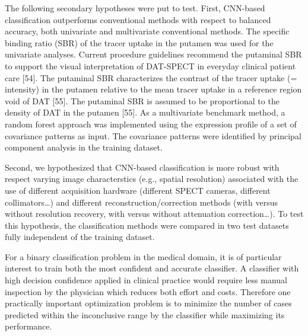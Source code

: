 The following secondary hypotheses were put to test. First, CNN-based classification outperforms conventional methods with respect to balanced accuracy, 
both univariate and multivariate conventional methods. 
The specific binding ratio (SBR) of the tracer uptake in the putamen was used for the univariate analyses. 
Current procedure guidelines recommend the putaminal SBR to support the visual interpretation of DAT-SPECT in everyday clinical patient care [54]. 
The putaminal SBR characterizes the contrast of the tracer uptake (= intensity) in the putamen relative to the mean tracer uptake in a reference 
region void of DAT [55]. 
The putaminal SBR is assumed to be proportional to the density of DAT in the putamen [55]. 
As a multivariate benchmark method, a random forest approach was implemented using the expression profile of a set of covariance patterns as input. 
The covariance patterns were identified by principal component analysis in the training dataset. 

Second, we hypothesized that CNN-based classification is more robust with respect varying image characterstics (e.g., spatial resolution) 
associated with the use of different acquisition hardware (different SPECT cameras, different collimators…) and different reconstruction/correction methods 
(with versus without resolution recovery, with versus without attenuation correction…). 
To test this hypothesis, the classification methods were compared in two test datasets fully independent of the training dataset.






For a binary classification problem in the medical domain, it is of particular interest to train both the most confident and 
accurate classifier.
A classifier with high decision confidence applied in clinical practice would require less manual inspection by the
physician which reduces both effort and costs.
Therefore one practically important optimization problem is to minimize the number of cases predicted within the inconclusive range 
by the classifier while maximizing its performance.


